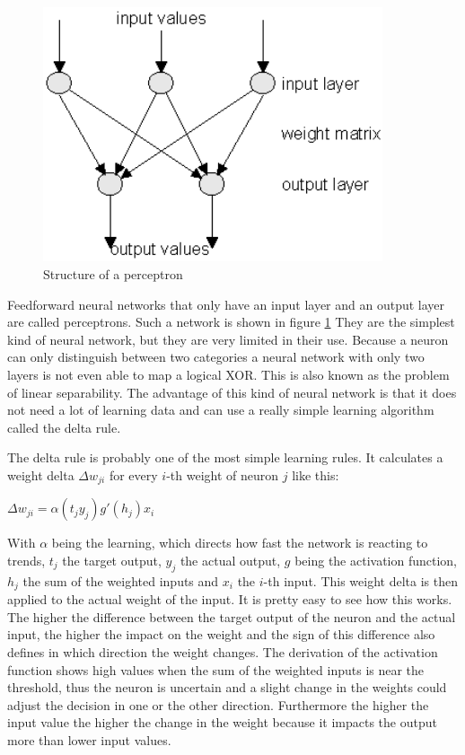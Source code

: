 \begin{figure}[ht]
	\centering
  \includegraphics[width=10cm]{figures/perceptron}
	\caption[Structure of a perceptron]{Structure of a perceptron \protect\footnotemark}
	\label{perceptron}
\end{figure}

Feedforward neural networks that only have an input layer and an output layer are called perceptrons. Such a network is shown in figure \ref{perceptron} They are the simplest kind of neural network, but they are very limited in their use. Because a neuron can only distinguish between two categories a neural network with only two layers is not even able to map a logical XOR. This is also known as the problem of linear separability. The advantage of this kind of neural network is that it does not need a lot of learning data and can use a really simple learning algorithm called the delta rule.

The delta rule is probably one of the most simple learning rules. It calculates a weight delta $\Delta w_{ji}$ for every $i$-th weight of neuron $j$ like this:

\begin{center}
	$\Delta w_{ji} = \alpha (t_j  y_j)g'(h_j)x_i$
\end{center}

With $\alpha$ being the learning, which directs how fast the network is reacting to trends, $t_j$ the target output, $y_j$ the actual output, $g$ being the activation function, $h_j$ the sum of the weighted inputs and $x_i$ the $i$-th input. This weight delta is then applied to the actual weight of the input. It is pretty easy to see how this works. The higher the difference between the target output of the neuron and the actual input, the higher the impact on the weight and the sign of this difference also defines in which direction the weight changes. The derivation of the activation function shows high values when the sum of the weighted inputs is near the threshold, thus the neuron is uncertain and a slight change in the weights could adjust the decision in one or the other direction. Furthermore the higher the input value the higher the change in the weight because it impacts the output more than lower input values.

